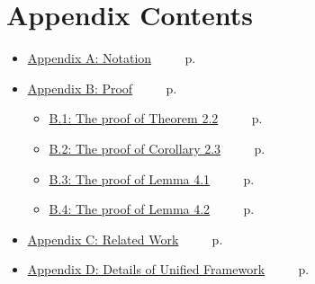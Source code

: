 \appendix
\onecolumn
\clearpage
\section*{Appendix Contents} %
\begin{itemize}
  \item \hyperlink{app:app_notation}{Appendix A: Notation} ~~~~ p.\pageref{app_notation}
 \vspace{4pt}
   
  
  \item \hyperlink{app:proof}{Appendix B: Proof} ~~~~ p.\pageref{app_proof}
  \vspace{4pt}
  \begin{itemize}[leftmargin=2em, nosep] %
    \item \hyperlink{app_proof_th_dual}{B.1: The proof of Theorem 2.2} ~~~~ p.\pageref{app_proof_th_dual} \\
    \item \hyperlink{app_proof_cora_de}{B.2: The proof of Corollary 2.3} ~~~~ p.\pageref{app_proof_cora_de}\\
    \item \hyperlink{app_proof_cora_de}{B.3: The proof of Lemma 4.1} ~~~~ p.\pageref{app_proof_cora_de}\\
    \item \hyperlink{app_proof_le_norm}{B.4: The proof of Lemma 4.2} ~~~~ p.\pageref{app_proof_le_norm}
  \end{itemize}
  \vspace{4pt}

   \item \hyperlink{app:related_work}{Appendix C: Related Work} ~~~~ p.\pageref{app:related_work}
   
   \vspace{4pt}
   \item \hyperlink{app_uni_fram}{Appendix D: Details of Unified Framework} ~~~~ p.\pageref{app_uni_fram}


\end{itemize}
